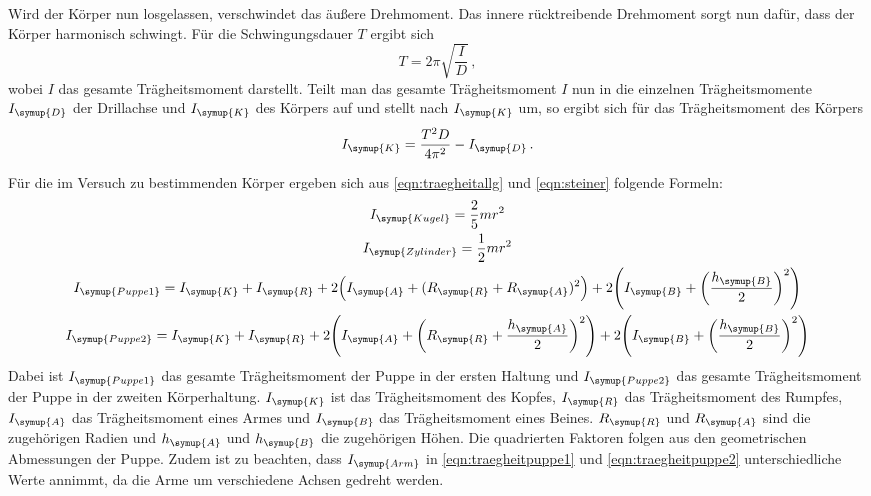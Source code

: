 Wird der Körper nun losgelassen, verschwindet das äußere Drehmoment. Das innere
rücktreibende Drehmoment sorgt nun dafür, dass der Körper harmonisch schwingt.
Für die Schwingungsdauer $T$ ergibt sich
\begin{equation}
  T=2\pi\sqrt{\frac{I}{D}}\,,
  \label{eqn:schwingung}
\end{equation}
wobei $I$ das gesamte Trägheitsmoment darstellt. Teilt man das gesamte Trägheitsmoment
$I$ nun in die einzelnen Trägheitsmomente $I_{\symup{D}}$ der Drillachse und
$I_{\symup{K}}$ des Körpers auf und stellt nach $I_{\symup{K}}$ um, so ergibt sich für
das Trägheitsmoment des Körpers
\begin{equation}
  I_{\symup{K}}=\frac{T^2D}{4\pi^2}-I_{\symup{D}}\,.
  \label{eqn:traegheitschwingung}
\end{equation}

Für die im Versuch zu bestimmenden Körper ergeben sich aus \eqref{eqn:traegheitallg}
und \eqref{eqn:steiner} folgende Formeln:
\begin{gather}
  I_{\symup{Kugel}}=\frac{2}{5}mr^2
  \label{eqn:traegheitkugel} \\
  I_{\symup{Zylinder}}=\frac{1}{2}mr^2
  \label{eqn:traegheitzylinder} \\
  \begin{split}
    I_{\symup{Puppe1}}=I_{\symup{K}}+I_{\symup{R}}
    +2\Bigl(I_{\symup{A}}+(R_{\symup{R}}+R_{\symup{A}})^2\Bigr)
    +2\Biggl(I_{\symup{B}}+\biggl(\frac{h_{\symup{B}}}{2}\biggr)^2\Biggr)
    \label{eqn:traegheitpuppe1}
  \end{split}
  \\
  \begin{split}
    I_{\symup{Puppe2}}=I_{\symup{K}}+I_{\symup{R}}
    +2\Biggl(I_{\symup{A}}+\biggl(R_{\symup{R}}+\frac{h_{\symup{A}}}{2}\biggr)^2\Biggr)
    +2\Biggl(I_{\symup{B}}+\biggl(\frac{h_{\symup{B}}}{2}\biggr)^2\Biggr)
    \label{eqn:traegheitpuppe2}
  \end{split}
\end{gather}
Dabei ist $I_{\symup{Puppe1}}$ das gesamte Trägheitsmoment der Puppe in der ersten
Haltung und $I_{\symup{Puppe2}}$ das gesamte Trägheitsmoment der Puppe in der
zweiten Körperhaltung. $I_{\symup{K}}$ ist das Trägheitsmoment des Kopfes, $I_{\symup{R}}$
das Trägheitsmoment des Rumpfes, $I_{\symup{A}}$ das Trägheitsmoment eines Armes und
$I_{\symup{B}}$ das Trägheitsmoment eines Beines. $R_{\symup{R}}$ und $R_{\symup{A}}$ sind die zugehörigen
Radien und $h_{\symup{A}}$ und $h_{\symup{B}}$ die zugehörigen Höhen. Die quadrierten Faktoren folgen
aus den geometrischen Abmessungen der Puppe. Zudem ist zu beachten, dass $I_{\symup{Arm}}$
in \eqref{eqn:traegheitpuppe1} und \eqref{eqn:traegheitpuppe2} unterschiedliche Werte
annimmt, da die Arme um verschiedene Achsen gedreht werden.
